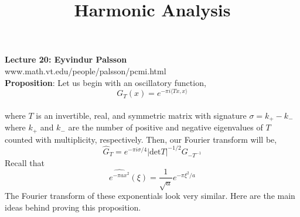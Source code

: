 \documentclass[12pt]{article}
\title{Harmonic Analysis}
\begin{document}
\noindent \textbf{Lecture 20: Eyvindur Palsson} \\
\noindent www.math.vt.edu/people/palsson/pcmi.html \\


\noindent \textbf{Proposition}: Let us begin with an oscillatory function, 
$$G_T(x)=e^{-\pi i \langle Tx,x\rangle}$$ \\
where $T$ is an invertible, real, and symmetric matrix with signature $\sigma = k_+ - k_-$ where $k_+$ and $k_-$ are the number of positive and negative eigenvalues of $T$ counted with multiplicity, respectively. Then, our Fourier transform will be,
$$\hat{G}_T = e^{-\pi i \sigma/4} \vert \text{det} T \vert^{-1/2} G_{-T^{-1}}$$
Recall that 
$$\widehat{e^{-\pi ax^2}}(\xi) = \frac{1}{\sqrt{a}} e^{-\pi \xi^2/a}$$
The Fourier transform of these exponentials look very similar. Here are the main ideas behind proving this proposition. \\
\end{document}
